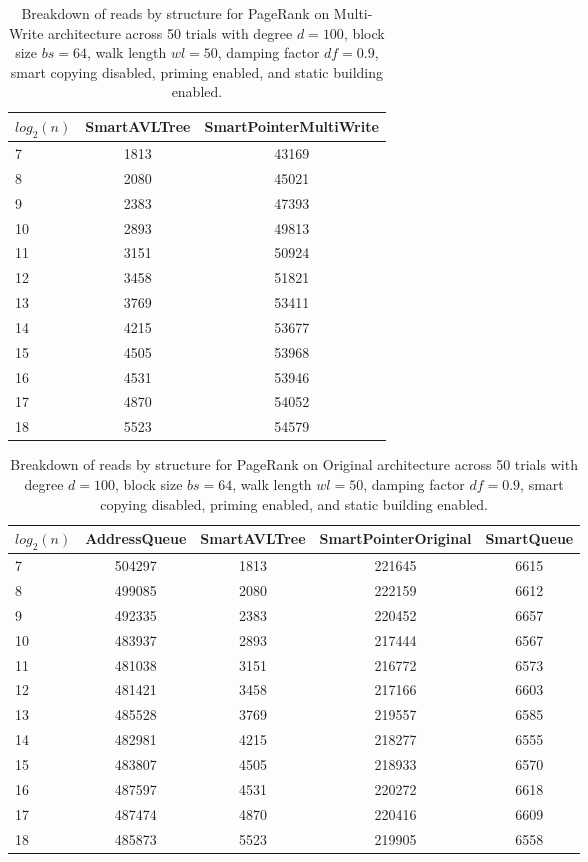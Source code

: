 \begin{table}[]
\centering
\begin{tabular}{|l|c|c|}
$log_2(n)$ & SmartAVLTree & SmartPointerMultiWrite \\ \hline
7 & 1813 & 43169 \\ \hline
8 & 2080 & 45021 \\ \hline
9 & 2383 & 47393 \\ \hline
10 & 2893 & 49813 \\ \hline
11 & 3151 & 50924 \\ \hline
12 & 3458 & 51821 \\ \hline
13 & 3769 & 53411 \\ \hline
14 & 4215 & 53677 \\ \hline
15 & 4505 & 53968 \\ \hline
16 & 4531 & 53946 \\ \hline
17 & 4870 & 54052 \\ \hline
18 & 5523 & 54579 \\ \hline
\end{tabular}
\caption{Breakdown of reads by structure for PageRank on Multi-Write architecture across 50 trials with degree $d=100$, block size $bs=64$, walk length $wl=50$, damping factor $df=0.9$, smart copying disabled, priming enabled, and static building enabled.}
    \label{tab:reads_by_structure_pr_d100_bs64_trials50_copiesfalse_primetrue_staticinsertiontrue_wl50_df0.9_ptmultiwrite_movetrue}
\end{table}

\begin{table}[]
\centering
\begin{tabular}{|l|c|c|c|c|}
$log_2(n)$ & AddressQueue & SmartAVLTree & SmartPointerOriginal & SmartQueue \\ \hline
7 & 504297 & 1813 & 221645 & 6615 \\ \hline
8 & 499085 & 2080 & 222159 & 6612 \\ \hline
9 & 492335 & 2383 & 220452 & 6657 \\ \hline
10 & 483937 & 2893 & 217444 & 6567 \\ \hline
11 & 481038 & 3151 & 216772 & 6573 \\ \hline
12 & 481421 & 3458 & 217166 & 6603 \\ \hline
13 & 485528 & 3769 & 219557 & 6585 \\ \hline
14 & 482981 & 4215 & 218277 & 6555 \\ \hline
15 & 483807 & 4505 & 218933 & 6570 \\ \hline
16 & 487597 & 4531 & 220272 & 6618 \\ \hline
17 & 487474 & 4870 & 220416 & 6609 \\ \hline
18 & 485873 & 5523 & 219905 & 6558 \\ \hline
\end{tabular}
\caption{Breakdown of reads by structure for PageRank on Original architecture across 50 trials with degree $d=100$, block size $bs=64$, walk length $wl=50$, damping factor $df=0.9$, smart copying disabled, priming enabled, and static building enabled.}
    \label{tab:reads_by_structure_pr_d100_bs64_trials50_copiesfalse_primetrue_staticinsertiontrue_wl50_df0.9_ptoriginal_movefalse}
\end{table}

